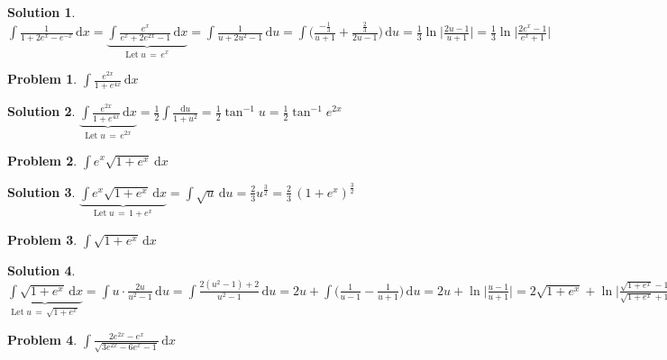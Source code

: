 \documentclass[11pt,a4paper]{article}
\newcommand{\ds}{\displaystyle}
\theoremstyle{definition}
\newtheorem*{problem}{Problem}
\newtheorem*{solution}{Solution}
\begin{document}
\begin{solution}
  $\ds\int\!\frac{1}{1+2e^x-e^{-x}}\,\text{d}x = \underbrace{\int\!\frac{e^x}{e^x+2e^{2x}-1}\,\text{d}x}_{\text{Let}\;u\,=\,e^x} = \int\!\frac{1}{u + 2u^2 - 1}\,\text{d}u = \int\!\Big(\frac{-\frac{1}{3}}{u + 1} + \frac{\frac{2}{3}}{2 u - 1}\Big)\,\text{d}u = \frac{1}{3}\ln\Big|\frac{2u - 1}{u + 1}\Big| = \frac{1}{3}\ln\Big|\frac{2e^x - 1}{e^x + 1}\Big|$
\end{solution}

\begin{problem}
  $\ds\int\!\frac{e^{2x}}{1+e^{4x}}\,\text{d}x$
\end{problem}

\begin{solution}
  $\ds\underbrace{\int\!\frac{e^{2x}}{1+e^{4x}}\,\text{d}x}_{\text{Let}\;u\,=\,e^{2x}} = \frac{1}{2}\int\!\frac{\text{d}u}{1 + u^2} = \frac{1}{2}\tan^{-1}u = \frac{1}{2}\tan^{-1}\!e^{2x}$
\end{solution}

\begin{problem}
  $\ds\int\!e^x\sqrt{1 + e^x}\,\text{d}x$
\end{problem}

\begin{solution}
  $\ds\underbrace{\int\!e^x\sqrt{1 + e^x}\,\text{d}x}_{\text{Let}\;u\,=\,1 + e^x} = \int\!\sqrt{u}\,\text{d}u = \frac{2}{3}u^{\frac{3}{2}} = \frac{2}{3}\,(1 + e^x)^{\frac{3}{2}}$
\end{solution}

\begin{problem}
  $\ds\int\!\sqrt{1 + e^x}\,\text{d}x$
\end{problem}

\begin{solution}
  $\ds\underbrace{\int\!\sqrt{1 + e^x}\,\text{d}x}_{\text{Let}\;u\,=\,\sqrt{1 + e^x}} = \int\!u\cdot\frac{2u}{u^2 - 1}\,\text{d}u = \int\!\frac{2(u^2 - 1) + 2}{u^2 - 1}\,\text{d}u = 2u + \int\!\Big(\frac{1}{u - 1} - \frac{1}{u + 1}\Big)\,\text{d}u = 2u + \ln\Big|\frac{u - 1}{u + 1}\Big| = 2\sqrt{1 + e^x} + \ln\Big|\frac{\sqrt{1 + e^x} - 1}{\sqrt{1 + e^x} + 1}\Big|$
\end{solution}

\begin{problem}
  $\ds\int\!\frac{2e^{2x}-e^x}{\sqrt{3e^{2x}-6e^x-1}}\,\text{d}x$
\end{problem}
\end{document}
